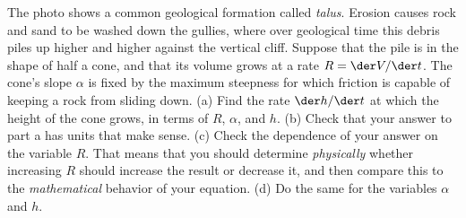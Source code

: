 The photo shows a common geological formation called \emph{talus}. Erosion causes
rock and sand to be washed down the gullies, where  over geological time
this debris piles up higher and higher
against the vertical cliff.
Suppose that the pile is
in the shape of half a cone, and that its volume grows at a
rate $R=\der V/\der t$.
The cone's slope $\alpha$ is fixed by the maximum steepness
for which friction is capable of keeping a rock from sliding down.
(a) Find the rate $\der h/\der t$ at which the height of the cone
grows, in terms of $R$, $\alpha$, and $h$.
(b) Check that your answer to part a has units that make sense.
(c) Check the dependence of your answer on the variable $R$.
That means that you should determine \emph{physically} whether increasing $R$ should increase
the result or decrease it, and then compare this to the \emph{mathematical}
behavior of your equation.
(d) Do the same for the variables $\alpha$ and $h$.
